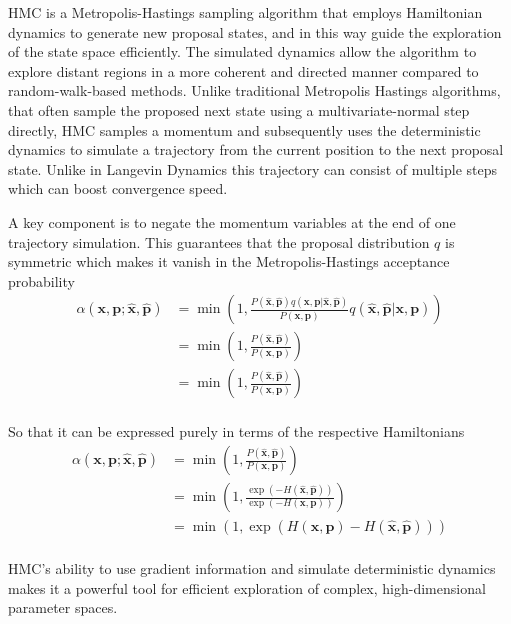 HMC is a Metropolis-Hastings sampling algorithm that employs Hamiltonian dynamics to generate new proposal states, 
and in this way guide the exploration of the state space efficiently. 
The simulated dynamics allow the algorithm to explore distant regions in a more coherent and directed manner compared to random-walk-based methods.
Unlike traditional Metropolis Hastings algorithms, that often sample the proposed next state using a multivariate-normal step directly, 
HMC samples a momentum and subsequently uses the deterministic dynamics to simulate a trajectory from the current position to the next proposal state.
Unlike in Langevin Dynamics this trajectory can consist of multiple steps which can boost convergence speed. 

A key component is to negate the momentum variables at the end of one trajectory simulation. 
This guarantees that the proposal distribution $q$ is symmetric which makes it vanish in the Metropolis-Hastings acceptance probability
\[
\begin{aligned}
	\alpha(\bm{x}, \bm{p}; \hat{\bm{x}}, \hat{\bm{p}})
	&= \min \left(1, \frac{P(\hat{\bm{x}}, \hat{\bm{p}}) q(\bm{x}, \bm{p} | \hat{\bm{x}}, \hat{\bm{p}} ) }{P(\bm{x}, \bm{p})} q(\hat{\bm{x}}, \hat{\bm{p}} | \bm{x}, \bm{p} ) \right) \\
	&= \min \left(1, \frac{P(\hat{\bm{x}}, \hat{\bm{p}}) }{P(\bm{x}, \bm{p})} \right) \\
	&= \min \left(1, \frac{P(\hat{\bm{x}}, \hat{\bm{p}}) }{P(\bm{x}, \bm{p})} \right) \\
\end{aligned}
\]

So that it can be expressed purely in terms of the respective Hamiltonians
\[
\begin{aligned}
	\alpha(\bm{x}, \bm{p}; \hat{\bm{x}}, \hat{\bm{p}})
	&= \min \left(1, \frac{P(\hat{\bm{x}}, \hat{\bm{p}}) }{P(\bm{x}, \bm{p})} \right) \\
	&= \min \left(1, \frac{ \exp( - H(\hat{\bm{x}}, \hat{\bm{p}}) ) }{ \exp( - H(\bm{x}, \bm{p}) ) } \right) \\
	&= \min \left(1, \exp( H(\bm{x}, \bm{p}) - H(\hat{\bm{x}}, \hat{\bm{p}}) ) \right) \\
\end{aligned}
\]

HMC's ability to use gradient information and simulate deterministic dynamics makes it a powerful tool for efficient exploration of complex, high-dimensional parameter spaces.



